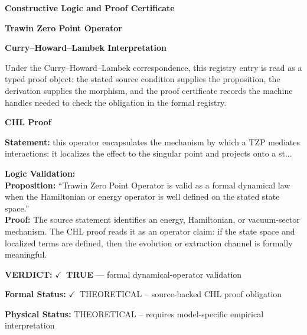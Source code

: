 \clearpage
\begingroup\tzpsupportsetup
\noindent\textbf{\fontsize{10.8pt}{12.8pt}\selectfont [ID 0332] Constructive Logic and Proof Certificate}\par
\noindent\textbf{\fontsize{10pt}{12pt}\selectfont Trawin Zero Point Operator}\par
\vspace{0.45em}
\begingroup
\footnotesize
\setlength{\parskip}{0.22em}
\setlength{\parindent}{0pt}
\noindent\textbf{Curry--Howard--Lambek Interpretation}\par
Under the Curry--Howard--Lambek correspondence, this registry entry is read as a typed proof
object: the stated source condition supplies the proposition, the derivation supplies the
morphism, and the proof certificate records the machine handles needed to check the obligation
in the formal registry.

\vspace{0.45em}
\noindent\textbf{CHL Proof}\par
\textbf{Statement:} this operator encapsulates the mechanism by which a TZP mediates interactions: it
localizes the effect to the singular point and projects onto a st...

\textbf{Logic Validation:}\\
\textbf{Proposition:} ``Trawin Zero Point Operator is valid as a formal dynamical law when the Hamiltonian or
energy operator is well defined on the stated state space.''\\
\textbf{Proof:} The source statement identifies an energy, Hamiltonian, or vacuum-sector mechanism. The
CHL proof reads it as an operator claim: if the state space and localized terms are
defined, then the evolution or extraction channel is formally meaningful.

\textbf{VERDICT:} \ensuremath{\checkmark}\ \textbf{TRUE} --- formal dynamical-operator validation

\textbf{Formal Status:} \ensuremath{\checkmark}\ THEORETICAL -- source-backed CHL proof obligation

\textbf{Physical Status:} THEORETICAL -- requires model-specific empirical interpretation
\par\vspace{0.45em}
\par
\ifTZPDarkEdition
{}
\fi
\endgroup
\endgroup
